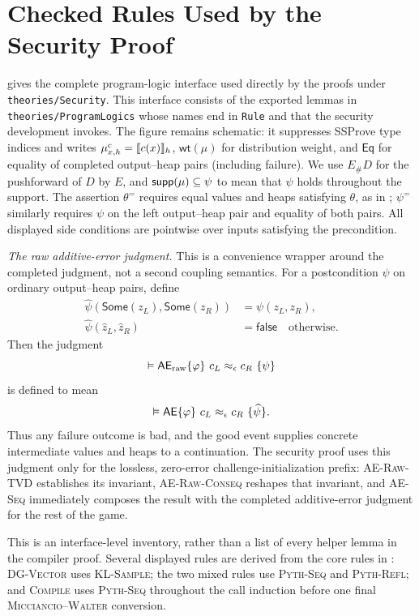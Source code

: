 \section{Checked Rules Used by the Security Proof}
\label{app:checked-rules}

 gives the complete program-logic interface
used directly by the proofs under \nolinkurl{theories/Security}.
This interface consists of the exported lemmas in
\nolinkurl{theories/ProgramLogics} whose names end in \texttt{Rule} and that the
security development invokes.
The figure remains schematic: it suppresses SSProve type indices and writes
\(\mu^c_{x,h}=\llbracket c(x)\rrbracket_h\), \(\mathsf{wt}(\mu)\) for distribution
weight, and \(\mathsf{Eq}\) for equality of completed output--heap pairs
(including failure).
We use \(E_\#D\) for the pushforward of \(D\) by \(E\), and
\(\mathsf{supp}(\mu)\subseteq \psi\) to mean that \(\psi\) holds throughout the support.
The assertion \(\theta^{=}\) requires equal values and heaps satisfying \(\theta\), as
in ; \(\psi^{=}\) similarly requires \(\psi\) on the left
output--heap pair and equality of both pairs.
All displayed side conditions are pointwise over inputs satisfying the
precondition.

\smallskip\noindent\emph{The raw additive-error judgment.}
This is a convenience wrapper around the completed judgment, not a second
coupling semantics.
For a postcondition \(\psi\) on ordinary output--heap pairs, define
\[
 \begin{aligned}
 \widehat{\psi}(\mathsf{Some}(z_L),\mathsf{Some}(z_R))
   &=\psi(z_L,z_R),\\
 \widehat{\psi}(\widehat z_L,\widehat z_R)
   &=\mathsf{false}\quad\text{otherwise}.
 \end{aligned}
\]
Then the judgment
\[
 \vDash\AEJ_{\rm raw}\{\varphi\}\ c_L\approx_\epsilon c_R\ \{\psi\}
\]
is defined to mean
\[
 \vDash\AEJ\{\varphi\}\ c_L\approx_\epsilon c_R\ \{\widehat{\psi}\}.
\]
Thus any failure outcome is bad, and the good event supplies concrete
intermediate values and heaps to a continuation.
The security proof uses this judgment only for the lossless, zero-error
challenge-initialization prefix: \textsc{AE-Raw-TVD} establishes its invariant,
\textsc{AE-Raw-Conseq} reshapes that invariant, and \textsc{AE-Seq} immediately
composes the result with the completed additive-error judgment for the rest of
the game.

This is an interface-level inventory, rather than a list of every helper
lemma in the compiler proof.
Several displayed rules are derived from the core rules in
: \textsc{DG-Vector} uses \textsc{KL-Sample}; the two
mixed rules use \textsc{Pyth-Seq} and \textsc{Pyth-Refl}; and
\textsc{Compile} uses \textsc{Pyth-Seq} throughout the call induction before
one final \textsc{Micciancio--Walter} conversion.

